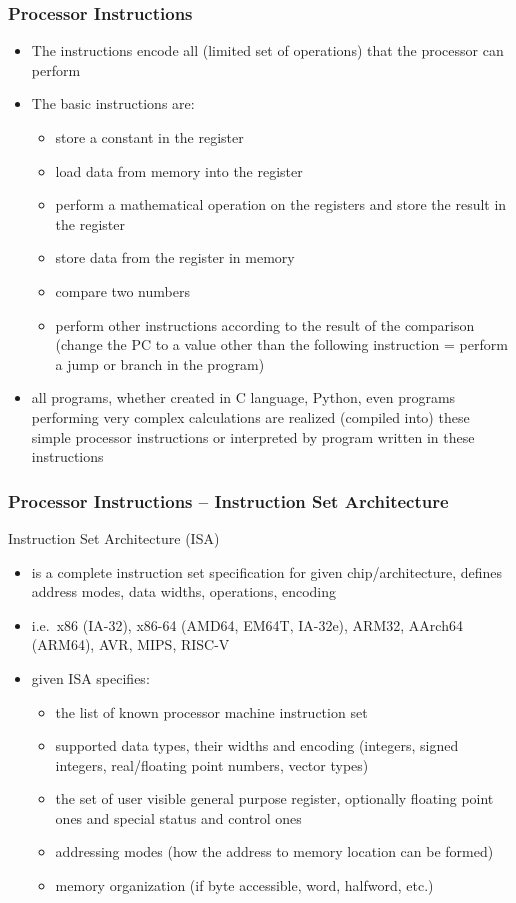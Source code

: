 \documentclass{beamer}
\begin{document}
\begin{frame}
\frametitle{Processor Instructions}

\begin{itemize}
\item The instructions encode all (limited set of operations) that the processor can perform
\item The basic instructions are:
\begin{itemize}
\item store a constant in the register
\item load data from memory into the register
\item perform a mathematical operation on the registers and store the result in the register
\item store data from the register in memory
\item compare two numbers
\item perform other instructions according to the result of the comparison (change the PC to a value other than the following instruction = perform a jump or branch in the program)
\end{itemize}
\item all programs, whether created in C language, Python, even programs performing very complex calculations are realized (compiled into) these simple processor instructions or interpreted by program written in these instructions
\end{itemize}

\end{frame}

\begin{frame}
\frametitle{Processor Instructions -- Instruction Set Architecture}

Instruction Set Architecture (ISA)
\begin{itemize}
\item  is a complete instruction set specification for given chip/architecture, defines address modes, data widths, operations, encoding
\item i.e.\ x86 (IA-32), x86-64 (AMD64, EM64T, IA-32e), ARM32, AArch64 (ARM64), AVR, MIPS, RISC-V
\item given ISA specifies:
\begin{itemize}
\item the list of known processor machine instruction set
\item supported data types, their widths and encoding (integers, signed integers, real/floating point numbers, vector types)
\item the set of user visible general purpose register, optionally floating point ones and special status and control ones
\item addressing modes (how the address to memory location can be formed)
\item memory organization (if byte accessible, word, halfword, etc.)
\end{itemize}
\end{itemize}

\end{frame}
\end{document}

